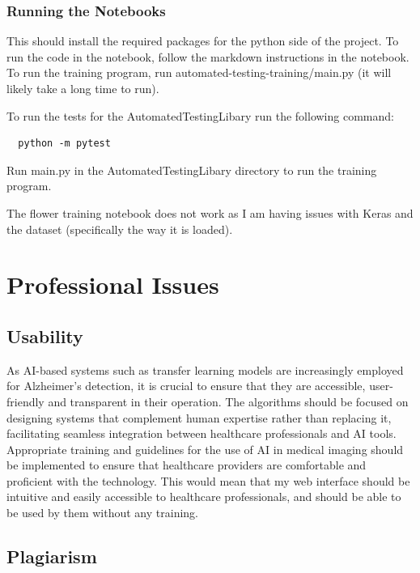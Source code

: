 \documentclass[]{final_report}
\begin{document}
\subsection{Running the Notebooks}

This should install the required packages for the python side of the project.
To run the code in the notebook, follow the markdown instructions in the notebook.
To run the training program, run automated-testing-training/main.py (it will likely take a long time to run).

To run the tests for the AutomatedTestingLibary run the following command:
\begin{lstlisting}
  python -m pytest 
\end{lstlisting}
Run main.py in the AutomatedTestingLibary directory to run the training program.

The flower training notebook does not work as I am having issues with Keras and the dataset (specifically the way it is loaded).

\chapter{Professional Issues}


\section{Usability}
As AI-based systems such as transfer learning models are increasingly employed for Alzheimer's detection, it is crucial to ensure that they are accessible, user-friendly and transparent in their operation. The algorithms should be focused on designing systems that complement human expertise rather than replacing it, facilitating seamless integration between healthcare professionals and AI tools. Appropriate training and guidelines for the use of AI in medical imaging should be implemented to ensure that healthcare providers are comfortable and proficient with the technology. This would mean that my web interface should be intuitive and easily accessible to healthcare professionals, and should be able to be used by them without any training.

\section{Plagiarism}
\end{document}
